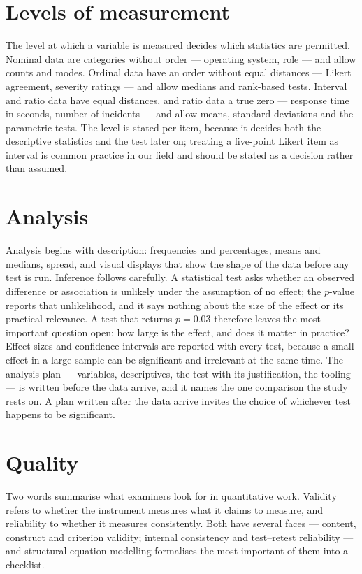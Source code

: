 \documentclass[11pt,a4paper,british,twoside=false,headings=small,chapterprefix=false,numbers=noenddot]{scrbook}
\begin{document}
\section{Levels of measurement}

The level at which a variable is measured decides which statistics are permitted. Nominal data are categories without order --- operating system, role --- and allow counts and modes. Ordinal data have an order without equal distances --- Likert agreement, severity ratings --- and allow medians and rank-based tests. Interval and ratio data have equal distances, and ratio data a true zero --- response time in seconds, number of incidents --- and allow means, standard deviations and the parametric tests. The level is stated per item, because it decides both the descriptive statistics and the test later on; treating a five-point Likert item as interval is common practice in our field and should be stated as a decision rather than assumed.

\section{Analysis}

Analysis begins with description: frequencies and percentages, means and medians, spread, and visual displays that show the shape of the data before any test is run. Inference follows carefully. A statistical test asks whether an observed difference or association is unlikely under the assumption of no effect; the $p$-value reports that unlikelihood, and it says nothing about the size of the effect or its practical relevance. A test that returns $p = 0.03$ therefore leaves the most important question open: how large is the effect, and does it matter in practice? Effect sizes and confidence intervals are reported with every test, because a small effect in a large sample can be significant and irrelevant at the same time. The analysis plan --- variables, descriptives, the test with its justification, the tooling --- is written before the data arrive, and it names the one comparison the study rests on. A plan written after the data arrive invites the choice of whichever test happens to be significant.

\section{Quality}

Two words summarise what examiners look for in quantitative work. Validity refers to whether the instrument measures what it claims to measure, and reliability to whether it measures consistently. Both have several faces --- content, construct and criterion validity; internal consistency and test--retest reliability --- and structural equation modelling formalises the most important of them into a checklist.
\end{document}
